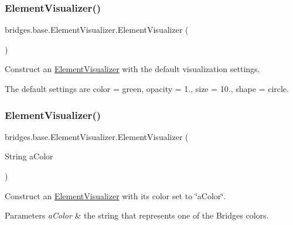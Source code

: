 \subsubsection{\texorpdfstring{Element\+Visualizer()}{ElementVisualizer()}\hspace{0.1cm}{\footnotesize\ttfamily [1/6]}}
{\footnotesize\ttfamily bridges.\+base.\+Element\+Visualizer.\+Element\+Visualizer (\begin{DoxyParamCaption}{ }\end{DoxyParamCaption})}

Construct an \mbox{\hyperlink{classbridges_1_1base_1_1_element_visualizer}{Element\+Visualizer}} with the default visualization settings.

The default settings are color = green, opacity = 1., size = 10., shape = circle. \mbox{\label{classbridges_1_1base_1_1_element_visualizer_a5c0d9fe8051ebc816372b9836689fdfa}} 
\subsubsection{\texorpdfstring{Element\+Visualizer()}{ElementVisualizer()}\hspace{0.1cm}{\footnotesize\ttfamily [2/6]}}
{\footnotesize\ttfamily bridges.\+base.\+Element\+Visualizer.\+Element\+Visualizer (\begin{DoxyParamCaption}\item[{String}]{a\+Color }\end{DoxyParamCaption})}

Construct an \mbox{\hyperlink{classbridges_1_1base_1_1_element_visualizer}{Element\+Visualizer}} with its color set to \char`\"{}a\+Color\char`\"{}.


\begin{DoxyParams}{Parameters}
{\em a\+Color} & the string that represents one of the Bridges colors. \\
\hline
\end{DoxyParams}
\mbox{\label{classbridges_1_1base_1_1_element_visualizer_ab62b1b06907fbeddfcee2b4b297e1021}} 
